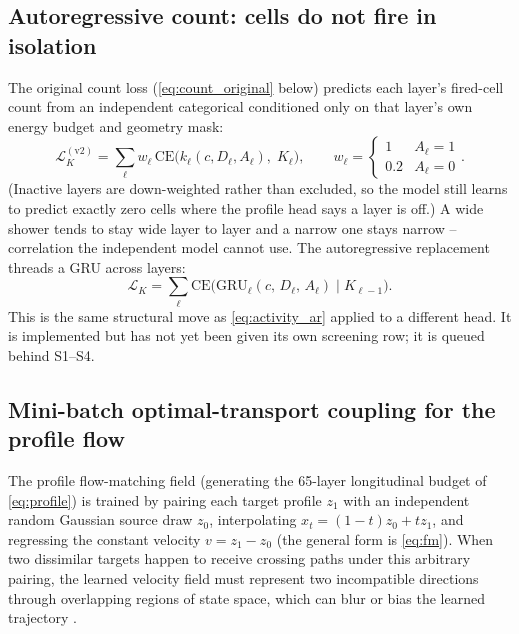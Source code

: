 \documentclass[10pt,a4paper]{article}
\begin{document}
\subsection{Autoregressive count: cells do not fire in isolation}
The original count loss (\cref{eq:count_original} below) predicts each layer's fired-cell count from an independent categorical conditioned only on that layer's own energy budget and geometry mask:
\begin{equation}
\mathcal{L}_K^{(\mathrm{v2})} = \sum_\ell w_\ell\, \mathrm{CE}\big(k_\ell(c, D_\ell, A_\ell),\; K_\ell\big), \qquad w_\ell = \begin{cases}1 & A_\ell = 1\\ 0.2 & A_\ell = 0\end{cases}.
\label{eq:count_original}
\end{equation}
(Inactive layers are down-weighted rather than excluded, so the model still learns to predict exactly zero cells where the profile head says a layer is off.) A wide shower tends to stay wide layer to layer and a narrow one stays narrow -- correlation the independent model cannot use. The autoregressive replacement threads a GRU across layers:
\begin{equation}
\mathcal{L}_K = \sum_\ell \mathrm{CE}\Big(\mathrm{GRU}_\ell(c,\, D_\ell,\, A_\ell) \;\Big|\; K_{\ell-1}\Big).
\label{eq:count_ar}
\end{equation}
This is the same structural move as \cref{eq:activity_ar} applied to a different head. It is implemented but has not yet been given its own screening row; it is queued behind S1--S4.

\subsection{Mini-batch optimal-transport coupling for the profile flow}
\label{sec:ot_cfm}
The profile flow-matching field (generating the 65-layer longitudinal budget of \cref{eq:profile}) is trained by pairing each target profile $z_1$ with an independent random Gaussian source draw $z_0$, interpolating $x_t = (1-t)z_0 + tz_1$, and regressing the constant velocity $v = z_1 - z_0$ (the general form is \cref{eq:fm}). When two dissimilar targets happen to receive crossing paths under this arbitrary pairing, the learned velocity field must represent two incompatible directions through overlapping regions of state space, which can blur or bias the learned trajectory \cite{flow_matching}.
\end{document}
